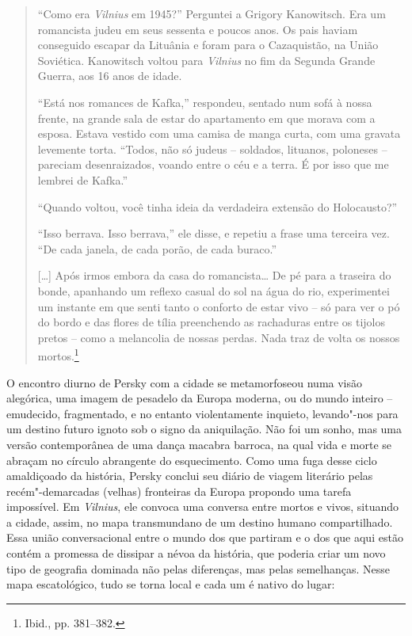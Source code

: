 \begin{quote}
``Como era \textit{Vilnius} em 1945?'' Perguntei a Grigory Kanowitsch. Era um
romancista judeu em seus sessenta e poucos anos. Os pais haviam
conseguido escapar da Lituânia e foram para o Cazaquistão, na União
Soviética. Kanowitsch voltou para \textit{Vilnius} no fim da Segunda Grande
Guerra, aos 16 anos de idade.

``Está nos romances de Kafka,'' respondeu, sentado num sofá à nossa
frente, na grande sala de estar do apartamento em que morava com a
esposa. Estava vestido com uma camisa de manga curta, com uma gravata
levemente torta. ``Todos, não só judeus -- soldados, lituanos, poloneses
-- pareciam desenraizados, voando entre o céu e a terra. É por isso que
me lembrei de Kafka.''

``Quando voltou, você tinha ideia da verdadeira extensão do
Holocausto?''

``Isso berrava. Isso berrava,'' ele disse, e repetiu a frase uma
terceira vez. ``De cada janela, de cada porão, de cada buraco.''

[\ldots{}] Após irmos embora da casa do romancista\ldots{} De pé para a
traseira do bonde, apanhando um reflexo casual do sol na água do rio,
experimentei um instante em que senti tanto o conforto de estar vivo --
só para ver o pó do bordo e das flores de tília preenchendo as
rachaduras entre os tijolos pretos -- como a melancolia de nossas perdas.
Nada traz de volta os nossos mortos.\footnote{Ibid., pp. 381--382.}
\end{quote}

O encontro diurno de Persky com a cidade se metamorfoseou numa visão
alegórica, uma imagem de pesadelo da Europa moderna, ou do mundo inteiro
-- emudecido, fragmentado, e no entanto violentamente inquieto,
levando"-nos para um destino futuro ignoto sob o signo da aniquilação.
Não foi um sonho, mas uma versão contemporânea de uma dança macabra
barroca, na qual vida e morte se abraçam no círculo abrangente do
esquecimento. Como uma fuga desse ciclo amaldiçoado da história, Persky
conclui seu diário de viagem literário pelas recém"-demarcadas (velhas)
fronteiras da Europa propondo uma tarefa impossível. Em \textit{Vilnius}, ele
convoca uma conversa entre mortos e vivos, situando a cidade, assim, no
mapa transmundano de um destino humano compartilhado. Essa união
conversacional entre o mundo dos que partiram e o dos que aqui estão
contém a promessa de dissipar a névoa da história, que poderia criar um
novo tipo de geografia dominada não pelas diferenças, mas pelas
semelhanças. Nesse mapa escatológico, tudo se torna local e cada um é
nativo do lugar:


